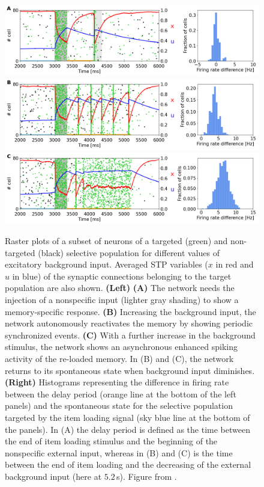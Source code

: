 \documentclass[a4paper, 12pt, twoside, openright]{book}
\begin{document}
\begin{figure}[H]
    \centering
    \includegraphics[width=0.9\columnwidth]{figures/fig2A.png}
    \includegraphics[width=0.9\columnwidth]{figures/fig2B.png}
    \includegraphics[width=0.9\columnwidth]{figures/fig2C.png}
    \caption{Raster plots of a subset of neurons of a targeted (green) and non-targeted (black) selective population for different values of excitatory background input. Averaged STP variables ($x$ in red and $u$ in blue) of the synaptic connections belonging to the target population are also shown. \textbf{(Left)} \textbf{(A)} The network needs the injection of a nonspecific input (lighter gray shading) to show a memory-specific response. \textbf{(B)} Increasing the background input, the network autonomously reactivates the memory by showing periodic synchronized events. \textbf{(C)} With a further increase in the background stimulus, the network shows an asynchronous enhanced spiking activity of the re-loaded memory. In (B) and (C), the network returns to its spontaneous state when background input diminishes. \textbf{(Right)} Histograms representing the difference in firing rate between the delay period (orange line at the bottom of the left panels) and the spontaneous state for the selective population targeted by the item loading signal (sky blue line at the bottom of the panels). In (A) the delay period is defined as the time between the end of item loading stimulus and the beginning of the nonspecific external input, whereas in (B) and (C) is the time between the end of item loading and the decreasing of the external background input (here at $5.2$\,s). Figure from \cite{Tiddia2022_WM}.}
    \label{fig:figure2}
\end{figure}
\end{document}
